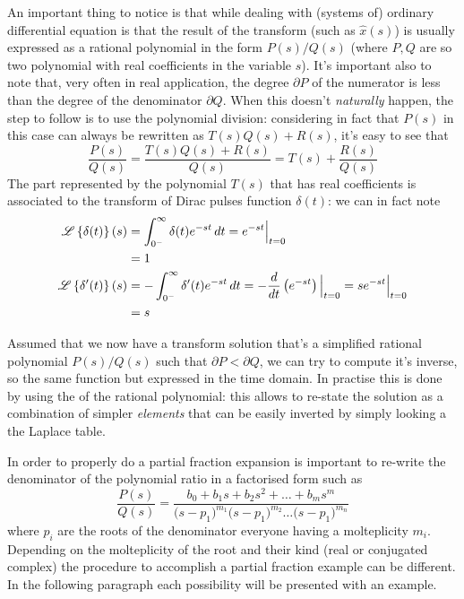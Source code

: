 	An important thing to notice is that while dealing with (systems of) ordinary differential equation is that the result of the transform (such as $\hat x(s)$) is usually expressed as a rational polynomial in the form $P(s)/Q(s)$ (where $P,Q$ are so two polynomial with real coefficients in the variable $s$). It's important also to note that, very often in real application, the degree $\partial P$ of the numerator is less than the degree of the denominator $\partial Q$. When this doesn't \textit{naturally} happen, the step to follow is to use the polynomial division: considering in fact that $P(s)$ in this case can always be rewritten as $T(s)Q(s) + R(s)$, it's easy to see that
	\[ \frac{P(s)}{Q(s)} = \frac{T(s)Q(s) + R(s)}{Q(s)} = T(s) + \frac{R(s)}{Q(s)} \]
	The part represented by the polynomial $T(s)$ that has real coefficients is associated to the transform of Dirac pulses function $\delta(t)$: we can in fact note
	\begin{equation}
		\begin{split}
			\mathscr{L} \left\{ \delta(t) \right\}(s) & = \int_{0^-}^\infty \delta(t) e^{-st}\, dt = e^{-st} \Big|_{t=0} \\ & = 1 \\
			\mathscr{L} \left\{ \delta'(t) \right\}(s) & = -\int_{0^-}^\infty \delta'(t) e^{-st} \, dt = - \frac d {dt} \left(e^{-st}\right) \Big|_{t=0} = s e^ {-st} \Big|_{t=0} \\ & = s
		\end{split}
	\end{equation} \vspace{0.5cm}

	Assumed that we now have a transform solution that's a simplified rational polynomial $P(s)/Q(s)$ such that $\partial P < \partial Q$, we can try to compute it's inverse, so the same function but expressed in the time domain. In practise this is done by using the  of the rational polynomial: this allows to re-state the solution as a combination of simpler \textit{elements} that can be easily inverted by simply looking a the Laplace table.
	
	In order to properly do a partial fraction expansion is important to re-write the denominator of the polynomial ratio in a factorised form such as
	\[ \frac{P(s)}{Q(s)} = \frac{b_0 + b_1 s + b_2s^2+ \dots + b_ms^m}{\big( s-p_1 \big)^{m_1} \big( s-p_1 \big)^{m_2} \dots \big( s-p_1 \big)^{m_n} } \]
	where $p_i$ are the roots of the denominator everyone having a molteplicity $m_i$. Depending on the molteplicity of the root and their kind (real or conjugated complex) the procedure to accomplish a partial fraction example can be different. In the following paragraph each possibility will be presented with an example.
	
